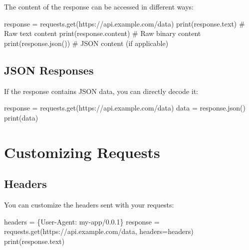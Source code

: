 \documentclass[
  letterpaper,
  DIV=11,
  numbers=noendperiod]{scrreprt}
\newenvironment{Shaded}{\begin{snugshade}}{\end{snugshade}}
\newcommand{\BuiltInTok}[1]{\textcolor[rgb]{0.00,0.23,0.31}{#1}}
\newcommand{\CommentTok}[1]{\textcolor[rgb]{0.37,0.37,0.37}{#1}}
\newcommand{\NormalTok}[1]{\textcolor[rgb]{0.00,0.23,0.31}{#1}}
\newcommand{\OperatorTok}[1]{\textcolor[rgb]{0.37,0.37,0.37}{#1}}
\newcommand{\StringTok}[1]{\textcolor[rgb]{0.13,0.47,0.30}{#1}}
\begin{document}
The content of the response can be accessed in different ways:

\begin{Shaded}
\begin{Highlighting}[]
\NormalTok{response }\OperatorTok{=}\NormalTok{ requests.get(}\StringTok{\textquotesingle{}https://api.example.com/data\textquotesingle{}}\NormalTok{)}
\BuiltInTok{print}\NormalTok{(response.text)  }\CommentTok{\# Raw text content}
\BuiltInTok{print}\NormalTok{(response.content)  }\CommentTok{\# Raw binary content}
\BuiltInTok{print}\NormalTok{(response.json())  }\CommentTok{\# JSON content (if applicable)}
\end{Highlighting}
\end{Shaded}

\subsection{JSON Responses}\label{json-responses}

If the response contains JSON data, you can directly decode it:

\begin{Shaded}
\begin{Highlighting}[]
\NormalTok{response }\OperatorTok{=}\NormalTok{ requests.get(}\StringTok{\textquotesingle{}https://api.example.com/data\textquotesingle{}}\NormalTok{)}
\NormalTok{data }\OperatorTok{=}\NormalTok{ response.json()}
\BuiltInTok{print}\NormalTok{(data)}
\end{Highlighting}
\end{Shaded}

\section{Customizing Requests}\label{customizing-requests}

\subsection{Headers}\label{headers}

You can customize the headers sent with your requests:

\begin{Shaded}
\begin{Highlighting}[]
\NormalTok{headers }\OperatorTok{=}\NormalTok{ \{}\StringTok{\textquotesingle{}User{-}Agent\textquotesingle{}}\NormalTok{: }\StringTok{\textquotesingle{}my{-}app/0.0.1\textquotesingle{}}\NormalTok{\}}
\NormalTok{response }\OperatorTok{=}\NormalTok{ requests.get(}\StringTok{\textquotesingle{}https://api.example.com/data\textquotesingle{}}\NormalTok{, headers}\OperatorTok{=}\NormalTok{headers)}
\BuiltInTok{print}\NormalTok{(response.text)}
\end{Highlighting}
\end{Shaded}
\end{document}
